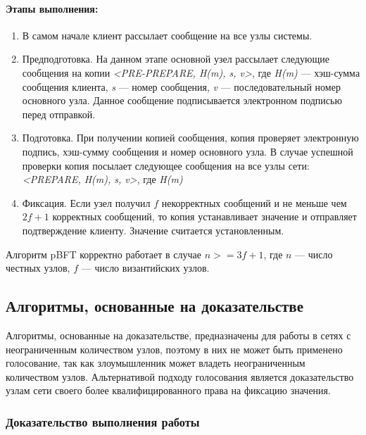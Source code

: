                 \paragraph{Этапы выполнения:}
                
                    \begin{enumerate}
                        \item В самом начале клиент рассылает сообщение на все узлы системы.
                        \item Предподготовка. На данном этапе основной узел рассылает следующие сообщения на копии \textit{<PRE-PREPARE, H(m), s, v>}, где \textit{H(m)} --- хэш-сумма сообщения клиента, \textit{s} --- номер сообщения, \textit{v} --- последовательный номер основного узла. Данное сообщение подписывается электронном подписью перед отправкой.
                        \item Подготовка. При получении копией сообщения, копия проверяет электронную подпись, хэш-сумму сообщения и номер основного узла. В случае успешной проверки копия посылает следующее сообщения на все узлы сети: \textit{<PREPARE, H(m), s, v>}, где \textit{H(m)}
                        \item Фиксация. Если узел получил \( f \) некорректных сообщений и не меньше чем \( 2f + 1 \) корректных сообщений, то копия устанавливает значение и отправляет подтверждение клиенту. Значение считается установленным.
                    \end{enumerate}
                
                Алгоритм pBFT корректно работает в случае \( n >= 3f + 1 \), где \( n \) --- число честных узлов, \( f \) --- число византийских узлов.

        \subsection{Алгоритмы, основанные на доказательстве}

            Алгоритмы, основанные на доказательстве, предназначены для работы в сетях с неограниченным количеством узлов, поэтому в них не может быть применено голосование, так как злоумышленник может владеть неограниченным количеством узлов. Альтернативой подходу голосования является доказательство узлам сети своего более квалифицированного права на фиксацию значения.

            \subsubsection{Доказательство выполнения работы}

